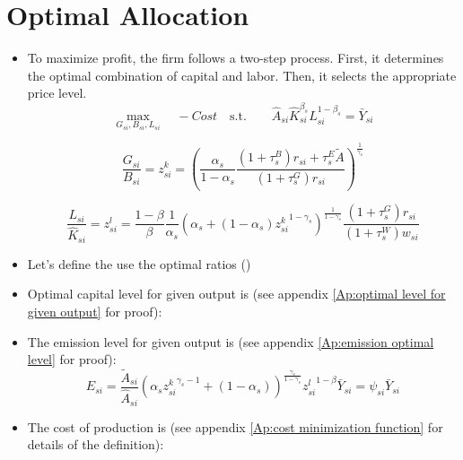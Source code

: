 \documentclass[12pt]{article} %
\begin{document}
\section*{Optimal Allocation}
\begin{itemize}
    \item To maximize profit, the firm follows a two-step process. First, it determines the optimal combination of capital and labor. Then, it selects the appropriate price level.
    \begin{equation*}
        \max_{{G_{si},B_{si},L_{si}}}  \quad
            - 		Cost \quad \text{s.t.} \quad \quad \hat{A}_{si}\hat{K}_{si}^{\beta_s} L_{si}^{1-\beta_s} = \bar{Y}_{si}
    \end{equation*}

    \begin{equation}
        {\frac{G_{si}}{B_{si}} = {z_{si}^k}} {=  \left(
            \frac{\alpha_s}{1-\alpha_s} \frac{(1+{\tau_s^B})r_{si} + {\tau_s^E}\tilde{A}}{(1+{\tau_s^G})r_{si}}
        \right) ^{\frac{1}{\gamma_s}}}
    \end{equation}

    \begin{equation}
        {\frac{L_{si}}{\hat{K}_{si}} = {z_{si}^l}}
        { = \frac{1-\beta}{\beta}\frac{1}{\alpha_s}\left(
            \alpha_s + (1-\alpha_s) {{z_{si}^k}}^{1-\gamma_s}
        \right)^{\frac{1}{1-\gamma_s}} \frac{(1+{\tau_s^G})r_{si}}{(1+{\tau_s^W})w_{si}}}
    \end{equation}
  

    \item Let's define the use the optimal ratios ()
    
    \item Optimal capital level for given output is (see appendix \ref{Ap:optimal level for given output} for proof):
    

    \item The emission level for given output is (see appendix \ref{Ap:emission optimal level} for proof):
    \begin{equation}
        {E_{si} = \frac{\tilde{A}_{si}}{\hat{A}_{si}}\left(
            \alpha_s {{z_{si}^k}}^{\gamma_s - 1} + (1-\alpha_s)
        \right) ^ {\frac{\gamma_s}{1-\gamma_s}} {{z_{si}^l}}^{1 - \beta} \bar{Y}_{si} }
        {= {\psi_{si}}\bar{Y}_{si}}
    \end{equation}
    
    \item The cost of production is (see appendix \ref{Ap:cost minimization function} for details of the definition):
    
    

\end{itemize}
\end{document}

